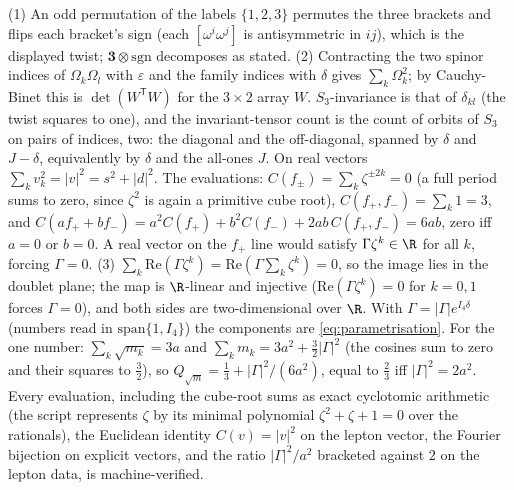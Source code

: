 (1) An odd permutation of the labels $\{1,2,3\}$ permutes the three brackets and flips each bracket's sign (each $[\omega^{i}\omega^{j}]$ is antisymmetric in $ij$), which is the displayed twist; $\mathbf{3} \otimes \mathrm{sgn}$ decomposes as stated. (2) Contracting the two spinor indices of $\Omega_{k}\Omega_{l}$ with $\varepsilon$ and the family indices with $\delta$ gives $\sum_{k}\Omega_{k}^{2}$; by Cauchy-Binet this is $\det(W^{\mathsf{T}}W)$ for the $3 \times 2$ array $W$. $S_{3}$-invariance is that of $\delta_{kl}$ (the twist squares to one), and the invariant-tensor count is the count of orbits of $S_{3}$ on pairs of indices, two: the diagonal and the off-diagonal, spanned by $\delta$ and $J - \delta$, equivalently by $\delta$ and the all-ones $J$. On real vectors $\sum_{k}v_{k}^{2} = |v|^{2} = s^{2} + |d|^{2}$. The evaluations: $C(f_{\pm}) = \sum_{k}\zeta^{\pm 2k} = 0$ (a full period sums to zero, since $\zeta^{2}$ is again a primitive cube root), $C(f_{+}, f_{-}) = \sum_{k}1 = 3$, and $C(af_{+} + bf_{-}) = a^{2}C(f_{+}) + b^{2}C(f_{-}) + 2ab\,C(f_{+}, f_{-}) = 6ab$, zero iff $a = 0$ or $b = 0$. A real vector on the $f_{+}$ line would satisfy $\Gamma\zeta^{k} \in \R$ for all $k$, forcing $\Gamma = 0$. (3) $\sum_{k}\mathrm{Re}(\Gamma\zeta^{k}) = \mathrm{Re}(\Gamma\sum_{k}\zeta^{k}) = 0$, so the image lies in the doublet plane; the map is $\R$-linear and injective ($\mathrm{Re}(\Gamma\zeta^{k}) = 0$ for $k = 0, 1$ forces $\Gamma = 0$), and both sides are two-dimensional over $\R$. With $\Gamma = |\Gamma|e^{I_4\delta}$ (numbers read in $\mathrm{span}\{1, I_4\}$) the components are \eqref{eq:parametrisation}. For the one number: $\sum_{k}\sqrt{m_{k}} = 3a$ and $\sum_{k}m_{k} = 3a^{2} + \tfrac32|\Gamma|^{2}$ (the cosines sum to zero and their squares to $\tfrac32$), so $Q_{\sqrt{m}} = \tfrac13 + |\Gamma|^{2}/(6a^{2})$, equal to $\tfrac23$ iff $|\Gamma|^{2} = 2a^{2}$. Every evaluation, including the cube-root sums as exact cyclotomic arithmetic (the script represents $\zeta$ by its minimal polynomial $\zeta^{2} + \zeta + 1 = 0$ over the rationals), the Euclidean identity $C(v) = |v|^{2}$ on the lepton vector, the Fourier bijection on explicit vectors, and the ratio $|\Gamma|^{2}/a^{2}$ bracketed against $2$ on the lepton data, is machine-verified.
